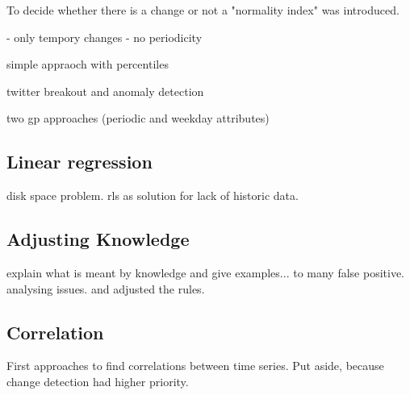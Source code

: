 \documentclass[]{article}
\begin{document}
To decide whether there is a change or not a "normality index" was introduced.


- only tempory changes
- no periodicity


simple appraoch with percentiles

twitter breakout and anomaly detection

two gp approaches (periodic and weekday attributes)

\subsection{Linear regression}
disk space problem. rls as solution for lack of historic data.

\subsection{Adjusting Knowledge}
explain what is meant by knowledge and give examples... to many false positive. analysing issues. and adjusted the rules.

\subsection{Correlation}
First approaches to find correlations between time series. Put aside, because change detection had higher priority.
\end{document}

